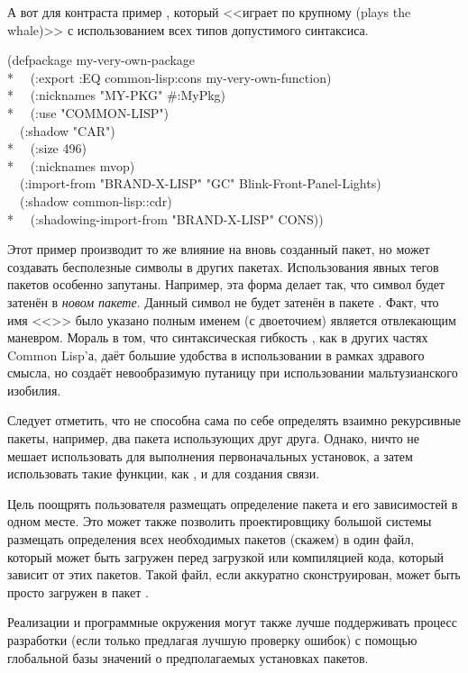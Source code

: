 \begin{defmac}
А вот для контраста пример , который <<играет по крупному (plays
the whale)>> с использованием всех типов допустимого синтаксиса.
\begin{lisp}
(defpackage my-very-own-package \\*
~~(:export :EQ common-lisp:cons my-very-own-function) \\*
~~(:nicknames "MY-PKG" \#:MyPkg) \\*
~~(:use "COMMON-LISP") \\
~~(:shadow "CAR") \\*
~~(:size 496) \\*
~~(:nicknames mvop) \\
~~(:import-from "BRAND-X-LISP" "GC" Blink-Front-Panel-Lights) \\
~~(:shadow common-lisp::cdr) \\*
~~(:shadowing-import-from "BRAND-X-LISP" CONS))
\end{lisp}
Этот пример производит то же влияние на вновь созданный пакет,  но может
создавать бесполезные символы в других пакетах.
Использования явных тегов пакетов особенно запутаны.
Например, эта форма  делает так, что символ  будет
затенён в \emph{новом пакете}. Данный символ не будет затенён в пакете
. Факт, что имя <<>> было указано полным именем (с
двоеточием) является отвлекающим маневром.
Мораль в том, что синтаксическая гибкость , как в других частях
Common Lisp'а, даёт большие удобства в использовании в рамках здравого смысла, 
но создаёт невообразимую путаницу при использовании мальтузианского изобилия.

Следует отметить, что  не способна сама по себе определять
взаимно рекурсивные пакеты, например, два пакета использующих друг друга. Однако,
ничто не мешает использовать  для выполнения первоначальных
установок, а затем использовать такие функции, как ,
 и  для создания связи.

Цель  поощрять пользователя размещать определение пакета и его
зависимостей в одном месте. Это может также позволить проектировщику большой
системы размещать определения всех необходимых пакетов (скажем) в один файл,
который может быть загружен перед загрузкой или компиляцией кода, который
зависит от этих пакетов. Такой файл, если аккуратно сконструирован, может быть
просто загружен в пакет .

Реализации и программные окружения могут также лучше поддерживать процесс
разработки (если только предлагая лучшую проверку ошибок) с помощью глобальной
базы значений о предполагаемых установках пакетов.
\end{defmac}

